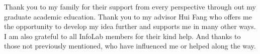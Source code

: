 Thank you to my family for their support from every perspective through out my graduate academic education. 
Thank you to my advisor Hui Fang who offers me the opportunity to develop my idea further and supports me in many other ways. 
I am also grateful to all InfoLab members for their kind help. 
And thanks to those not previously mentioned, who have influenced me or helped along the way.
